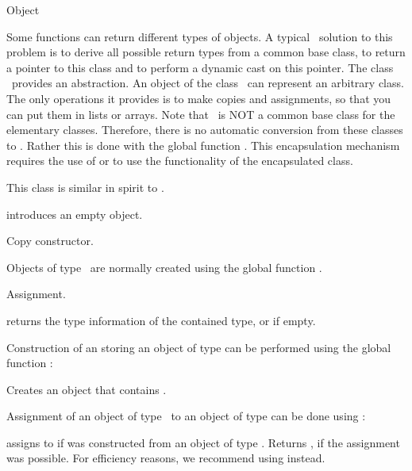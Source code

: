 \begin{ccRefClass}{Object}


\ccDefinition  
Some functions can return different types of objects. A typical
\CC\ solution to this problem is to derive all possible return
types from a common base class, to return a pointer to this 
class and to perform a dynamic cast on this pointer. The class
\ccRefName\ provides an abstraction.
An object  of the class \ccRefName\ can
represent an arbitrary class. The only operations it provides is
to make copies and assignments, so that you can put them in lists
or arrays. Note that \ccRefName\ is NOT a common base class for the
elementary classes. Therefore, there is no 
automatic conversion from these classes to \ccRefName. Rather 
this is done with the global function . This 
encapsulation mechanism requires the use of  or
 to use the functionality of the encapsulated class.

This class is similar in spirit to .

\ccCreation
{}

            {introduces an empty object.}

            {Copy constructor.}

Objects of type \ccRefName\ are normally created using the global function
.

\ccOperations

            {Assignment.}


         {returns the type information of the contained type,
          or  if empty.}

Construction of an  storing an object of type 
can be performed using the  global function :

{Creates an object that contains .}


Assignment of an object of type \ccRefName\ to an object of type  
can be done using  :

       {assigns  to  if 
        was constructed from an object of type .
        Returns , if the assignment was possible.
	For efficiency reasons, we recommend using  instead.}



\end{ccRefClass}
